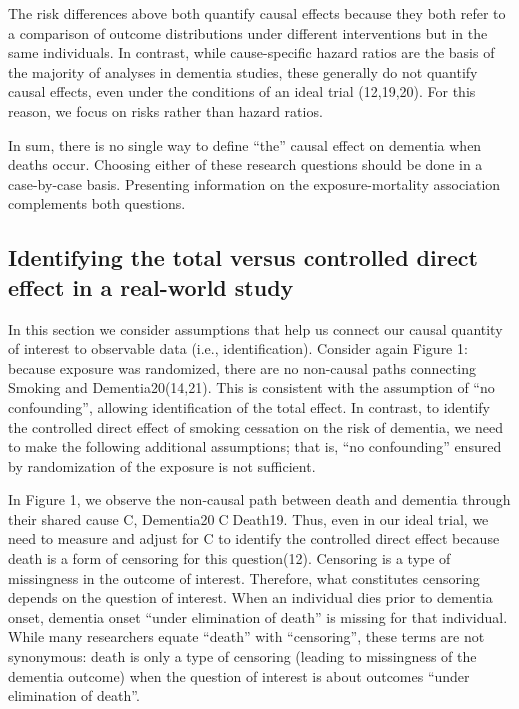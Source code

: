 \documentclass[
]{book}
\begin{document}
The risk differences above both quantify causal effects because they both refer to a comparison of outcome distributions under different interventions but in the same individuals. In contrast, while cause-specific hazard ratios are the basis of the majority of analyses in dementia studies, these generally do not quantify causal effects, even under the conditions of an ideal trial (12,19,20). For this reason, we focus on risks rather than hazard ratios.

In sum, there is no single way to define ``the'' causal effect on dementia when deaths occur. Choosing either of these research questions should be done in a case-by-case basis. Presenting information on the exposure-mortality association complements both questions.

\hypertarget{identifying-the-total-versus-controlled-direct-effect-in-a-real-world-study}{%
\subsection{Identifying the total versus controlled direct effect in a real-world study}\label{identifying-the-total-versus-controlled-direct-effect-in-a-real-world-study}}

In this section we consider assumptions that help us connect our causal quantity of interest to observable data (i.e., identification). Consider again Figure 1: because exposure was randomized, there are no non-causal paths connecting Smoking and Dementia20(14,21). This is consistent with the assumption of ``no confounding'', allowing identification of the total effect. In contrast, to identify the controlled direct effect of smoking cessation on the risk of dementia, we need to make the following additional assumptions; that is, ``no confounding'' ensured by randomization of the exposure is not sufficient.

In Figure 1, we observe the non-causal path between death and dementia through their shared cause C, Dementia20CDeath19. Thus, even in our ideal trial, we need to measure and adjust for C to identify the controlled direct effect because death is a form of censoring for this question(12). Censoring is a type of missingness in the outcome of interest. Therefore, what constitutes censoring depends on the question of interest. When an individual dies prior to dementia onset, dementia onset ``under elimination of death'' is missing for that individual. While many researchers equate ``death'' with ``censoring'', these terms are not synonymous: death is only a type of censoring (leading to missingness of the dementia outcome) when the question of interest is about outcomes ``under elimination of death''.
\end{document}
